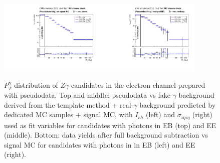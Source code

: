 \begin{figure}[htb]
\begin{center}
\includegraphics[width=0.45\textwidth]{../figs/figs_v11/ELECTRON_ZGamma/PrepareYields/c_BkgSubtrDATAvsSIGMC_c_ELECTRON_ZGamma__UNblind_MCclosure__Barrel__phoEt_MCclosure.pdf}\includegraphics[width=0.45\textwidth]{../figs/figs_v11/ELECTRON_ZGamma/PrepareYields/c_BkgSubtrDATAvsSIGMC_c_ELECTRON_ZGamma__UNblind_MCclosure__Endcap__phoEt_MCclosure.pdf}\\
  \caption{$P_T^{\gamma}$ distribution of $Z\gamma$ candidates in the electron channel prepared with pseudodata. Top and middle: pseudodata vs fake-$\gamma$ background derived from the template method + real-$\gamma$ background predicted by dedicated MC samples + signal MC, with $I_{ch}$ (left) and $\sigma_{i\eta i\eta}$ (right) used as fit variables for candidates with photons in EB (top) and EE (middle). Bottom: data yields after full background subtraction vs signal MC for candidates with photons in in EB (left) and EE (right).}
  \label{fig:DDvsMC_Zg_MCclosure_ELECTRON}
  \end{center}
\end{figure}

\clearpage

